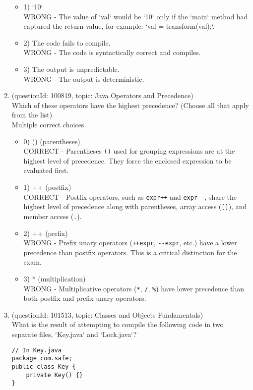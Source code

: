 \documentclass[12pt]{article}
\begin{document}
\begin{enumerate}[label=(\arabic*)]
\begin{itemize}
\item 1) `10`
 \\ 
WRONG - The value of `val` would be `10` only if the `main` method had captured the return value, for example: `val = transform(val);`.

\item 2) The code fails to compile.
 \\ 
WRONG - The code is syntactically correct and compiles.

\item 3) The output is unpredictable.
 \\ 
WRONG - The output is deterministic.

\end{itemize}
\item (questionId: 100819, topic: Java Operators and Precedence) \\ 
Which of these operators have the highest precedence? (Choose all that apply from the list)
\\ \noindent Multiple correct choices. 
\begin{itemize}
\item 0) () (parentheses)
 \\ 
CORRECT - Parentheses \verb|()| used for grouping expressions are at the highest level of precedence. They force the enclosed expression to be evaluated first.

\item 1) ++ (postfix)
 \\ 
CORRECT - Postfix operators, such as \verb|expr++| and \verb|expr--|, share the highest level of precedence along with parentheses, array access (\verb|[]|), and member access (\verb|.|).

\item 2) ++ (prefix)
 \\ 
WRONG - Prefix unary operators (\verb|++expr|, \verb|--expr|, etc.) have a lower precedence than postfix operators. This is a critical distinction for the exam.

\item 3) * (multiplication)
 \\ 
WRONG - Multiplicative operators (\verb|*|, \verb|/|, \verb|%|) have lower precedence than both postfix and prefix unary operators.

\end{itemize}
\item (questionId: 101513, topic: Classes and Objects Fundamentals) \\ 
What is the result of attempting to compile the following code in two separate files, `Key.java` and `Lock.java`?\n\begin{verbatim}
// In Key.java
package com.safe;
public class Key {
    private Key() {}
}


\end{verbatim}
\end{enumerate}
\end{document}
